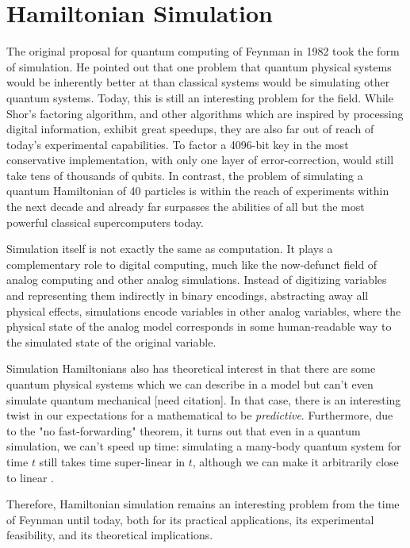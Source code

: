 \section{Hamiltonian Simulation}

The original proposal for quantum computing of Feynman in 1982 \cite{Feynman1982}
took the form of simulation. He pointed out that one problem that
quantum physical systems would be inherently better at than classical systems
would be simulating other quantum systems. Today, this is still an interesting
problem for the field. While Shor's factoring algorithm, and other algorithms
which are inspired by processing digital information, exhibit great speedups,
they are also far out of reach of today's experimental capabilities. To
factor a 4096-bit key in the most conservative implementation, with only
one layer of error-correction, would still take tens of thousands of qubits.
In contrast, the problem of simulating a quantum Hamiltonian of 40 particles
is within the reach of experiments within the next decade and already
far surpasses the abilities of all but the most powerful classical supercomputers
today.

Simulation itself is not exactly the same as computation. It
plays a complementary role to digital computing, much like the
now-defunct field of analog computing and other analog simulations. Instead
of digitizing variables and representing them indirectly in binary
encodings, abstracting away all physical effects, simulations encode variables
in other analog variables, where the physical state of the analog model
corresponds in some human-readable way to the simulated state of the
original variable.

Simulation Hamiltonians also has theoretical interest in that there are some
quantum physical systems which we can describe in a model
but can't even simulate quantum mechanical [need citation]. In that case,
there is an interesting twist in our expectations for a mathematical
to be \emph{predictive}. Furthermore, due to the "no fast-forwarding" theorem,
it turns out that even in a quantum simulation, we can't speed up time:
simulating a many-body quantum system for time $t$ still takes time
super-linear in $t$, although we can make it arbitrarily close to
linear \cite{Berry2005}.

Therefore, Hamiltonian simulation remains an interesting problem from the
time of Feynman until today, both for its practical applications, its
experimental feasibility, and its theoretical implications.

